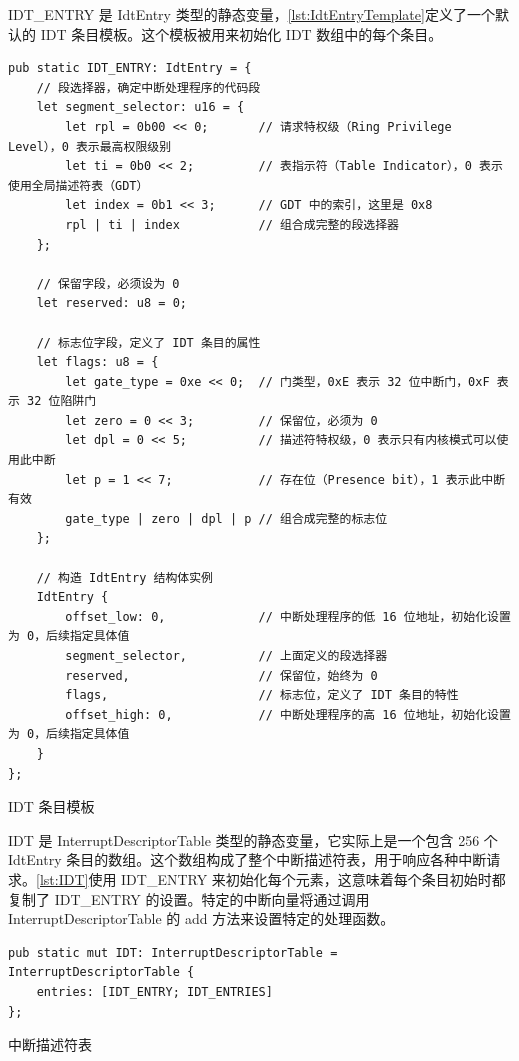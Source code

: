 IDT\_ENTRY 是 IdtEntry 类型的静态变量，\cref{lst:IdtEntryTemplate}定义了一个默认的 IDT 条目模板。这个模板被用来初始化 IDT 数组中的每个条目。

\begin{listing}[htbp]
    \begin{verbatim}
pub static IDT_ENTRY: IdtEntry = {
    // 段选择器，确定中断处理程序的代码段
    let segment_selector: u16 = {
        let rpl = 0b00 << 0;       // 请求特权级（Ring Privilege Level），0 表示最高权限级别
        let ti = 0b0 << 2;         // 表指示符（Table Indicator），0 表示使用全局描述符表（GDT）
        let index = 0b1 << 3;      // GDT 中的索引，这里是 0x8
        rpl | ti | index           // 组合成完整的段选择器
    };

    // 保留字段，必须设为 0
    let reserved: u8 = 0;

    // 标志位字段，定义了 IDT 条目的属性
    let flags: u8 = {
        let gate_type = 0xe << 0;  // 门类型，0xE 表示 32 位中断门，0xF 表示 32 位陷阱门
        let zero = 0 << 3;         // 保留位，必须为 0
        let dpl = 0 << 5;          // 描述符特权级，0 表示只有内核模式可以使用此中断
        let p = 1 << 7;            // 存在位（Presence bit），1 表示此中断有效
        gate_type | zero | dpl | p // 组合成完整的标志位
    };

    // 构造 IdtEntry 结构体实例
    IdtEntry {
        offset_low: 0,             // 中断处理程序的低 16 位地址，初始化设置为 0，后续指定具体值
        segment_selector,          // 上面定义的段选择器
        reserved,                  // 保留位，始终为 0
        flags,                     // 标志位，定义了 IDT 条目的特性
        offset_high: 0,            // 中断处理程序的高 16 位地址，初始化设置为 0，后续指定具体值
    }
};
    \end{verbatim}
    \caption{IDT 条目模板}\label{lst:IdtEntryTemplate}
\end{listing}

IDT 是 InterruptDescriptorTable 类型的静态变量，它实际上是一个包含 256 个 IdtEntry 条目的数组。这个数组构成了整个中断描述符表，用于响应各种中断请求。\cref{lst:IDT}使用 IDT\_ENTRY 来初始化每个元素，这意味着每个条目初始时都复制了 IDT\_ENTRY 的设置。特定的中断向量将通过调用 InterruptDescriptorTable 的 add 方法来设置特定的处理函数。

\begin{listing}[htbp]
    \begin{verbatim}
pub static mut IDT: InterruptDescriptorTable = InterruptDescriptorTable {
    entries: [IDT_ENTRY; IDT_ENTRIES]
};
    \end{verbatim}
    \caption{中断描述符表}\label{lst:IDT}
\end{listing}

